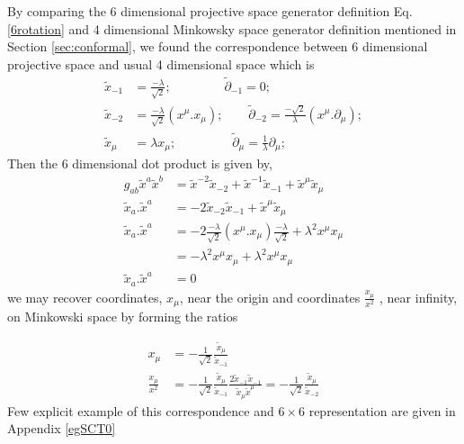 \documentclass[aps,reprint,notitlepage,nofootinbib,superscriptaddress]{revtex4-1}
\begin{document}
By comparing the 6 dimensional projective space generator definition Eq.\eqref{6rotation} and 4 dimensional Minkowsky space generator definition mentioned in Section \ref{sec:conformal}, we found the correspondence between 6 dimensional projective space and usual 4 dimensional space which is
\begin{align}\label{corres}
    \tilde{x}_{-1}&=\frac{-\lambda}{\sqrt{2}};~~~~~~~~~~~~~~~~~~~ \tilde{\partial}_{-1}=0;\\
    \tilde{x}_{-2}&=\frac{-\lambda}{\sqrt{2}}(x^\mu.x_\mu);~~~~~~~~~ \tilde{\partial}_{-2}=\frac{-\sqrt{2}}{\lambda}(x^\mu.\partial_\mu);\\
     \tilde{x}_{\mu}&=\lambda x_\mu;~~~~~~~~~~~~~~~~~~~~ \tilde{\partial}_{\mu}=\frac{1}{\lambda}\partial_\mu;
\end{align}
Then the 6 dimensional dot product is given by,
\begin{align}
    g_{ab}\tilde{x}^a \tilde{x}^b&=\tilde{x}^{-2}\tilde{x}_{-2}+\tilde{x}^{-1}\tilde{x}_{-1}+\tilde{x}^{\mu}\tilde{x}_{\mu}\\
    \tilde{x}_{a}.\tilde{x}^{a}&=-2\tilde{x}_{-2}\tilde{x}_{-1}+\tilde{x}^{\mu}\tilde{x}_{\mu}\\
     \tilde{x}_{a}.\tilde{x}^{a}&=-2\frac{-\lambda}{\sqrt{2}}(x^\mu.x_\mu)\frac{-\lambda}{\sqrt{2}}+\lambda^2{x}^{\mu}{x}_{\mu}\\
     &=-\lambda^2{x}^{\mu}{x}_{\mu}+\lambda^2{x}^{\mu}{x}_{\mu}\\
      \tilde{x}_{a}.\tilde{x}^{a}&=0
\end{align}
we may recover coordinates, $x_\mu$, near the origin and coordinates $\frac{x_\mu}{x^2}$ , near infinity, on Minkowski space by forming the ratios
    
    \begin{align}\label{origin}
     x_\mu&=-\frac{1}{\sqrt{2}}\frac{\tilde{x}_{\mu}}{ \tilde{x}_{-1}}\\
     \frac{x_\mu}{x^2}&=-\frac{1}{\sqrt{2}}\frac{\tilde{x}_{\mu}}{\tilde{x}_{-1}}\frac{2\tilde{x}_{-1}\tilde{x}_{-1}}{\tilde{x}_{\mu}\tilde{x}^{\mu}}=-\frac{1}{\sqrt{2}}\frac{\tilde{x}_{\mu}}{\tilde{x}_{-2}}
    \end{align}
Few explicit example of this correspondence and $6\times6$ representation are given in Appendix \ref{egSCT0}
\end{document}
